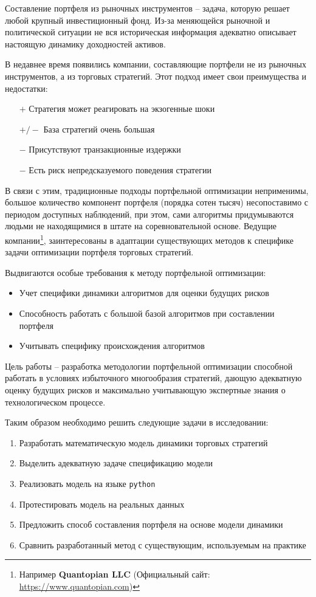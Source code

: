 Составление портфеля из рыночных инструментов -- задача, которую решает любой крупный инвестиционный фонд. Из-за меняющейся рыночной и политической ситуации не вся историческая информация адекватно описывает настоящую динамику доходностей активов. 

В недавнее время появились компании, составляющие портфели не из рыночных инструментов, а из торговых стратегий. Этот подход имеет свои преимущества и недостатки: 
\begin{itemize}
	\item[$+$] Стратегия может реагировать на экзогенные шоки
	\item[$+/-$] База стратегий очень большая
	\item[$-$] Присутствуют транзакционные издержки
	\item[$-$] Есть риск непредсказуемого поведения стратегии
\end{itemize}

В связи с этим, традиционные подходы портфельной оптимизации неприменимы, большое количество компонент портфеля (порядка сотен тысяч) несопоставимо с периодом доступных наблюдений, при этом, сами алгоритмы придумываются людьми не находящимися в штате на соревновательной основе. Ведущие компании\footnote{Например \textbf{Quantopian LLC} (Официальный сайт: \href{https://www.quantopian.com}{https://www.quantopian.com})},
заинтересованы в адаптации существующих методов к специфике задачи оптимизации портфеля торговых стратегий.

Выдвигаются особые требования к методу портфельной оптимизации:
\begin{itemize}
	\item Учет специфики динамики алгоритмов для оценки будущих рисков
	\item Способность работать с большой базой алгоритмов при составлении портфеля
	\item Учитывать специфику происхождения алгоритмов
\end{itemize}

Цель работы -- разработка методологии портфельной оптимизации способной работать в условиях избыточного многообразия стратегий, дающую адекватную оценку будущих рисков и максимально учитывающую экспертные знания о технологическом процессе. 

Таким образом необходимо решить следующие задачи в исследовании:
\begin{enumerate}
\item Разработать математическую модель динамики торговых стратегий
\item Выделить адекватную задаче спецификацию модели
\item Реализовать модель на языке \texttt{python}
\item Протестировать модель на реальных данных
\item Предложить способ составления портфеля на основе модели динамики
\item Сравнить разработанный метод с существующим, используемым на практике
\end{enumerate}

